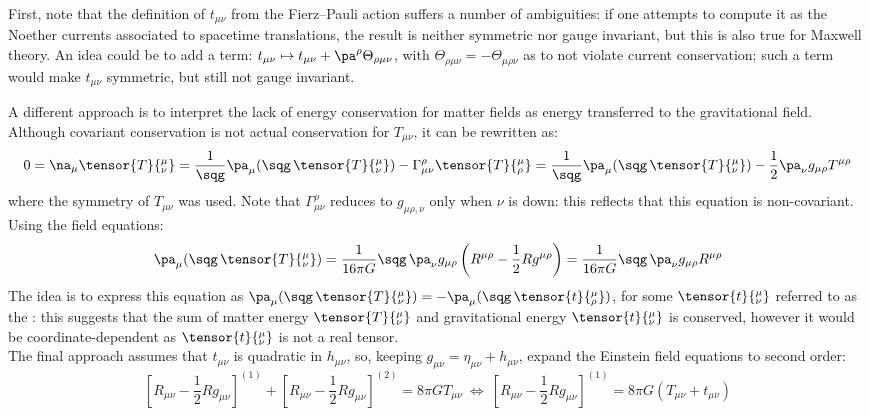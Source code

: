 First, note that the definition of $ t_{\mu \nu} $ from the Fierz--Pauli action suffers a number of ambiguities: if one attempts to compute it as the Noether currents associated to spacetime translations, the result is neither symmetric nor gauge invariant, but this is also true for Maxwell theory. An idea could be to add a term: $ t_{\mu \nu} \mapsto t_{\mu \nu} + \pa^\rho \Theta_{\rho \mu \nu} $, with $ \Theta_{\rho \mu \nu} = - \Theta_{\mu \rho \nu} $ as to not violate current conservation; such a term would make $ t_{\mu \nu} $ symmetric, but still not gauge invariant.

A different approach is to interpret the lack of energy conservation for matter fields as energy transferred to the gravitational field. Although covariant conservation is not actual conservation for $ T_{\mu \nu} $, it can be rewritten as:
\begin{equation*}
  0 = \na_\mu \tensor{T}{^\mu_\nu} = \frac{1}{\sqg} \pa_\mu (\sqg\, \tensor{T}{^\mu_\nu}) - \Gamma^\rho_{\mu \nu} \tensor{T}{^\mu_\rho} = \frac{1}{\sqg} \pa_\mu (\sqg\, \tensor{T}{^\mu_\nu}) - \frac{1}{2} \pa_\nu g_{\mu \rho} T^{\mu \rho}
\end{equation*}
where the symmetry of $ T_{\mu \nu} $ was used. Note that $ \Gamma^\rho_{\mu \nu} $ reduces to $ g_{\mu \rho , \nu} $ only when $ \nu $ is down: this reflects that this equation is non-covariant. Using the field equations:
\begin{equation*}
  \pa_\mu (\sqg\, \tensor{T}{^\mu_\nu}) = \frac{1}{16\pi G} \sqg\, \pa_\nu g_{\mu \rho} \left( R^{\mu \rho} - \frac{1}{2} R g^{\mu \rho} \right) = \frac{1}{16\pi G} \sqg\, \pa_\nu g_{\mu \rho} R^{\mu \rho}
\end{equation*}
The idea is to express this equation as $ \pa_\mu (\sqg\, \tensor{T}{^\mu_\nu}) = - \pa_\mu (\sqg\, \tensor{t}{^\mu_\rho}) $, for some $ \tensor{t}{^\mu_\nu} $ referred to as the : this suggests that the sum of matter energy $ \tensor{T}{^\mu_\nu} $ and gravitational energy $ \tensor{t}{^\mu_\nu} $ is conserved, however it would be coordinate-dependent as $ \tensor{t}{^\mu_\nu} $ is not a real tensor.\\
The final approach assumes that $ t_{\mu \nu} $ is quadratic in $ h_{\mu \nu} $, so, keeping $ g_{\mu \nu} = \eta_{\mu \nu} + h_{\mu \nu} $, expand the Einstein field equations to second order:
\begin{equation*}
  \left[ R_{\mu \nu} - \frac{1}{2} R g_{\mu \nu} \right]^{(1)} + \left[ R_{\mu \nu} - \frac{1}{2} R g_{\mu \nu} \right]^{(2)} = 8\pi G T_{\mu \nu}
  \ \iff \
  \left[ R_{\mu \nu} - \frac{1}{2} R g_{\mu \nu} \right]^{(1)} = 8\pi G (T_{\mu \nu} + t_{\mu \nu})
\end{equation*}
